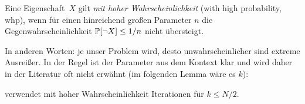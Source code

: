 \begin{definition}
    Eine  Eigenschaft~$X$ gilt \emph{mit hoher Wahrscheinlichkeit} (with high probability, whp),
    wenn für einen hinreichend großen Parameter $n$ die Gegenwahrscheinlichkeit $\mathbb{P}\!\left[\lnot X\right] \le 1/n$ nicht übersteigt.
\end{definition}

In anderen Worten: je  unser Problem wird, desto unwahrscheinlicher sind extreme Ausreißer.
In der Regel ist der Parameter aus dem Kontext klar und wird daher in der Literatur oft nicht erwähnt (im folgenden Lemma wäre es $k$):

\begin{lemma}
     verwendet mit hoher Wahrscheinlichkeit  Iterationen für $k \le N/2$.
\end{lemma}

